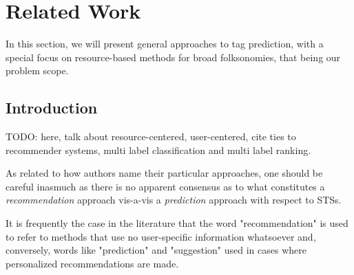 \chapter{Related Work}\label{chap:related_work}


In this section, we will present general approaches to tag prediction, with a special focus on resource-based  methods for broad folksonomies, that being our problem scope.

\section{Introduction}

{\color{red} TODO: here, talk about resource-centered, user-centered, cite ties to recommender systems, multi label classification and multi label ranking.}

As related to how authors name their particular approaches, one should be careful inasmuch as there is no apparent consensus as to what constitutes a \textit{recommendation} approach vis-a-vis a \textit{prediction} approach with respect to STSs. 

It is frequently the case in the literature that the word "recommendation" is used to refer to methods that use no user-specific information whatsoever and, conversely, words like "prediction" and "suggestion" used in cases where personalized recommendations are made.







